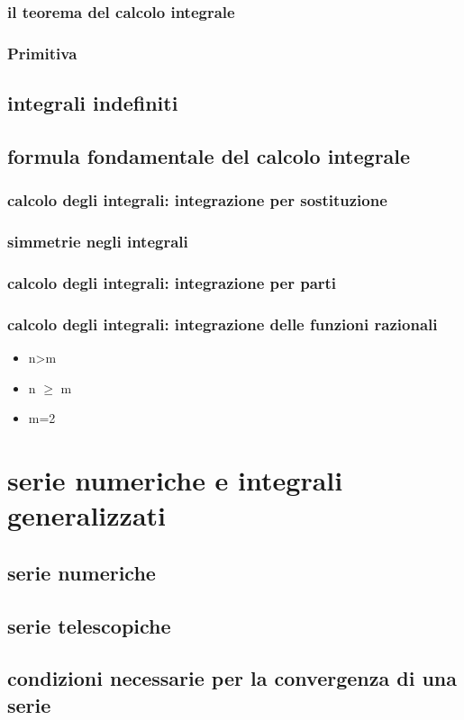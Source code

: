 \documentclass{article}
\theoremstyle{mystyle}
\begin{document}
\subsubsection{il teorema del calcolo integrale}
\subsubsection{Primitiva}
\subsection{integrali indefiniti}
\subsection{formula fondamentale del calcolo integrale}
\subsubsection{calcolo degli integrali: integrazione per sostituzione}
\subsubsection{simmetrie negli integrali}
\subsubsection{calcolo degli integrali: integrazione per parti}
\subsubsection{calcolo degli integrali: integrazione delle funzioni razionali}
\begin{itemize}
    \item n>m
    \item n $\geq$ m
    \item  m=2
\end{itemize}
\section{serie numeriche e integrali generalizzati}
\subsection{serie numeriche}
\subsection{serie telescopiche}
\subsection{condizioni necessarie per la convergenza di una serie}
\end{document}
